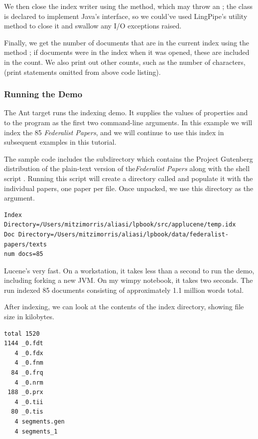 We then close the index
writer using the  method, which may throw an
; the  class is declared to
implement Java's  interface, so we could've used
LingPipe's  utility method to close it
and swallow any I/O exceptions raised.

Finally, we get the number of documents that are in the current index
using the method ; if documents were in the index when
it was opened, these are included in the count.  We also print out 
other counts, such as the number of characters, (print statements omitted
from above code listing).

\subsubsection{Running the Demo}

The Ant target  runs the indexing demo.  It
supplies the values of properties  and 
to the program as the first two command-line arguments.   
 In this example
we will index the 85 {\it Federalist Papers}, and we will continue to use this
index in subsequent examples in this tutorial. 

The sample code includes the
subdirectory  which contains the Project Gutenberg
distribution of the plain-text version of the{\it Federalist Papers} along with the
shell script .  Running this script will create a directory called 
and populate it with the individual papers, one paper per file.  
Once unpacked, we use this directory as the  argument.

%
\begin{verbatim}
Index Directory=/Users/mitzimorris/aliasi/lpbook/src/applucene/temp.idx
Doc Directory=/Users/mitzimorris/aliasi/lpbook/data/federalist-papers/texts
num docs=85
\end{verbatim}
%
Lucene's very fast.  On a workstation, it takes less than a second to
run the demo, including forking a new JVM.  On my wimpy notebook,
it takes two seconds. The run indexed 85
documents consisting of approximately 1.1 million words total.

After indexing, we can look at the contents of the index directory,
showing file size in kilobytes.
%
\begin{verbatim}
total 1520
1144 _0.fdt
   4 _0.fdx
   4 _0.fnm
  84 _0.frq
   4 _0.nrm
 188 _0.prx
   4 _0.tii
  80 _0.tis
   4 segments.gen
   4 segments_1
\end{verbatim}


